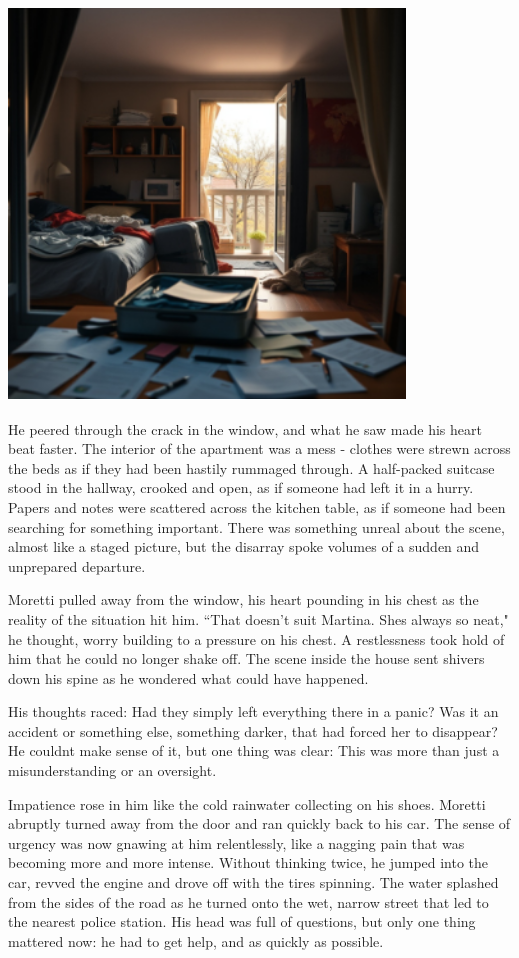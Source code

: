 \documentclass[
]{article}
\begin{document}
\includegraphics[width=4.14583in,height=4.11458in]{media/image003.png}

He peered through the crack in the window, and what he saw made his
heart beat faster. The interior of the apartment was a mess - clothes
were strewn across the beds as if they had been hastily rummaged
through. A half-packed suitcase stood in the hallway, crooked and open,
as if someone had left it in a hurry. Papers and notes were scattered
across the kitchen table, as if someone had been searching for something
important. There was something unreal about the scene, almost like a
staged picture, but the disarray spoke volumes of a sudden and
unprepared departure.

Moretti pulled away from the window, his heart pounding in his chest as
the reality of the situation hit him. ``That doesn't suit Martina.
She\textquotesingle s always so neat," he thought, worry building to a
pressure on his chest. A restlessness took hold of him that he could no
longer shake off. The scene inside the house sent shivers down his spine
as he wondered what could have happened.

His thoughts raced: Had they simply left everything there in a panic?
Was it an accident or something else, something darker, that had forced
her to disappear? He couldn\textquotesingle t make sense of it, but one
thing was clear: This was more than just a misunderstanding or an
oversight.

Impatience rose in him like the cold rainwater collecting on his shoes.
Moretti abruptly turned away from the door and ran quickly back to his
car. The sense of urgency was now gnawing at him relentlessly, like a
nagging pain that was becoming more and more intense. Without thinking
twice, he jumped into the car, revved the engine and drove off with the
tires spinning. The water splashed from the sides of the road as he
turned onto the wet, narrow street that led to the nearest police
station. His head was full of questions, but only one thing mattered
now: he had to get help, and as quickly as possible.
\end{document}
